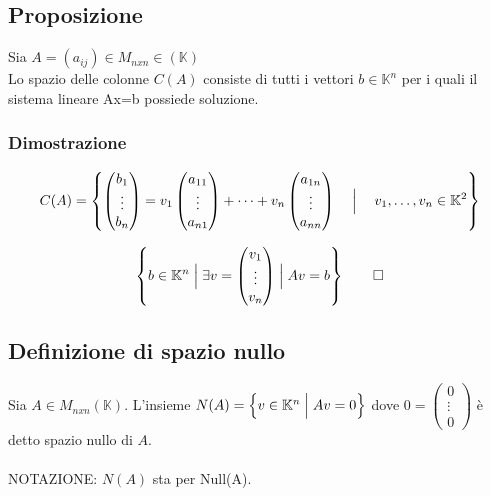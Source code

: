 \documentclass[12pt]{article}
\begin{document}
\subsection{Proposizione}

Sia $A = (a_{ij}) \in M_{nxn} \in (\mathbb{K})$ \\
Lo spazio delle colonne $C(A)$ consiste di tutti i vettori $b \in \mathbb{K}^n$ per i quali il sistema lineare Ax=b possiede soluzione.

\subsubsection{Dimostrazione}

\[C(A) = \left\{ \begin{pmatrix}
    b_1\\
    \vdots\\
    b_n
\end{pmatrix} = v_1 \begin{pmatrix}
    a_{11}\\
    \vdots\\
    a_{n1}
\end{pmatrix} + \dots + v_n \begin{pmatrix}
    a_{1n}\\
    \vdots\\
    a_{nn}
\end{pmatrix} \quad \Bigm\vert \quad v_1, \dots, v_n \in \mathbb{K}^2 \right\}\]

\[ \left\{  b \in \mathbb{K}^n \Bigm\vert \exists v = \begin{pmatrix}
    v_1\\
    \vdots\\
    v_n
\end{pmatrix} \Bigm\vert Av = b   \right\}  \quad \quad \square\]

\subsection{Definizione di spazio nullo}

Sia $A \in M_{nxn} (\mathbb{K})$. L'insieme $N(A) = \left\{v \in \mathbb{K}^n \Bigm\vert Av = 0\right\}$ dove $0 = \begin{pmatrix}
    0\\
    \vdots\\
    0
\end{pmatrix}$ è detto spazio nullo di $A$.
\\\\
NOTAZIONE: $N(A)$ sta per Null(A).
\end{document}
